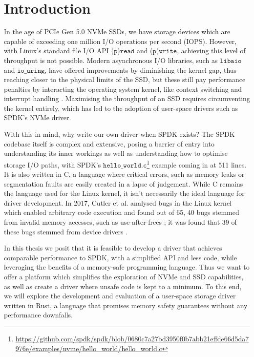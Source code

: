 \chapter{Introduction}\label{chapter:introduction}
In the age of PCIe Gen 5.0 NVMe SSDs, we have storage devices which are capable of exceeding one million I/O operations per second (IOPS). However, with Linux's standard file I/O API ($\texttt{p}$)$\texttt{read}$ and ($\texttt{p}$)$\texttt{write}$, achieving this level of throughput is not possible. Modern asynchronous I/O libraries, such as $\texttt{libaio}$ and $\texttt{io\_uring}$, have offered improvements by diminishing the kernel gap, thus reaching closer to the physical limits of the SSD, but these still pay performance penalties by interacting the operating system kernel, like context switching and interrupt handling \cite{storage_api}. Maximising the throughput of an SSD requires circumventing the kernel entirely, which has led to the adoption of user-space drivers such as SPDK's NVMe driver.

With this in mind, why write our own driver when SPDK exists? The SPDK codebase itself is complex and extensive, posing a barrier of entry into understanding its inner workings as well as understanding how to optimise storage I/O paths, with SPDK's $\texttt{hello\_world.c}$\footnote{\url{https://github.com/spdk/spdk/blob/0680c7a27bd3950f0b7abb21effde66d5da7976e/examples/nvme/hello_world/hello_world.c}} example coming in at 511 lines. It is also written in C, a language where critical errors, such as memory leaks or segmentation faults are easily created in a lapse of judgement. While C remains the language used for the Linux kernel, it isn't necessarily the ideal language for driver development. In 2017, Cutler et al. analysed bugs in the Linux kernel which enabled arbitrary code execution and found out of 65, 40 bugs stemmed from invalid memory accesses, such as use-after-frees \cite{cutler}; it was found that 39 of these bugs stemmed from device drivers \cite{driver_lang}.

In this thesis we posit that it is feasible to develop a driver that achieves comparable performance to SPDK, with a simplified API and less code, while leveraging the benefits of a memory-safe programming language. Thus we want to offer a platform which simplifies the exploration of NVMe and SSD capabilities, as well as create a driver where unsafe code is kept to a minimum. To this end, we will explore the development and evaluation of a user-space storage driver written in Rust, a language that promises memory safety guarantees without any performance downfalls.

